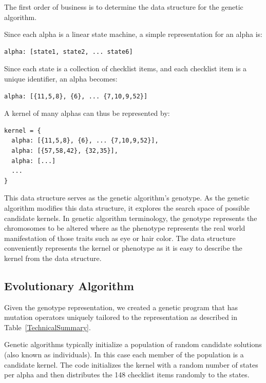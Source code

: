 \documentclass[preprint,12pt,3p]{elsarticle}
\begin{document}
The first order of business is to determine the data structure for the genetic algorithm.

Since each alpha is a linear state machine, a simple representation for an alpha is: 
\begin{verbatim}
alpha: [state1, state2, ... state6] 
\end{verbatim}


Since each state is a collection of checklist items, and each checklist item is a unique identifier, an alpha becomes:

\begin{verbatim}
alpha: [{11,5,8}, {6}, ... {7,10,9,52}]
\end{verbatim}

A kernel of many alphas can thus be represented by:

\begin{verbatim}
kernel = {
  alpha: [{11,5,8}, {6}, ... {7,10,9,52}],
  alpha: [{57,58,42}, {32,35}],
  alpha: [...]
  ...
}
\end{verbatim}

This data structure serves as the genetic algorithm's genotype. As the genetic algorithm modifies this data structure, it explores the search space of possible candidate kernels. In genetic algorithm terminology, the genotype represents the chromosomes to be altered where as the phenotype represents the real world manifestation of those traits such as eye or hair color. The data structure conveniently represents the kernel or phenotype as it is easy to describe the kernel from the data structure.\cite{Eiben2003} 

\subsection{Evolutionary Algorithm}
\label{Evolutionary Algorithm}

Given the genotype representation, we created a genetic program that has mutation operators uniquely tailored to the representation as described in Table~\ref{TechnicalSummary}.

Genetic algorithms typically initialize a population of random candidate solutions (also known as individuals). In this case each member of the population is a candidate kernel. The code initializes the kernel with a random number of states per alpha and then distributes the 148 checklist items randomly to the states. 
\end{document}
